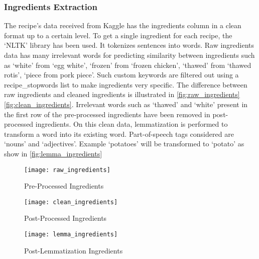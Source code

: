 \subsubsection{Ingredients Extraction}
The recipe's data received from Kaggle has the ingredients column in a clean format up to a certain level. To get a single ingredient for each recipe, the `NLTK' library has been used. It tokenizes sentences into words. Raw ingredients data has many irrelevant words for predicting similarity between ingredients such as `white' from `egg white', `frozen' from `frozen chicken', `thawed' from `thawed rotis', `piece from pork piece'. Such custom keywords are filtered out using a recipe\_stopwords list to make ingredients very specific. The difference between raw ingredients and cleaned ingredients is illustrated in \autoref{fig:raw_ingredients} \autoref{fig:clean_ingredients}. Irrelevant words such as `thawed' and `white' present in the first row of the pre-processed ingredients have been removed in post-processed ingredients. On this clean data, lemmatization is performed to transform a word into its existing word. Part-of-speech tags considered are `nouns' and `adjectives'. Example `potatoes' will be transformed to `potato' as show in \autoref{fig:lemma_ingredients}

\begin{singlespace}
\begin{figure}[H]
	\centering
	\texttt{[image: raw\_ingredients]}
	\caption{Pre-Processed Ingredients }
	\label{fig:raw_ingredients}
\end{figure}  
\end{singlespace}
\begin{singlespace}
\begin{figure}[H]
	\centering
	\texttt{[image: clean\_ingredients]}
	\caption{Post-Processed Ingredients }
	\label{fig:clean_ingredients}
\end{figure}  
\end{singlespace}
\begin{singlespace}
\begin{figure}[H]
	\centering
	\texttt{[image: lemma\_ingredients]}
	\caption{Post-Lemmatization Ingredients }
	\label{fig:lemma_ingredients}
\end{figure}  
\end{singlespace}

